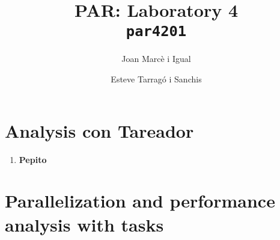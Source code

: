 \documentclass[a4paper]{article}
\title{PAR: Laboratory 4 \\
		\texttt{\large par4201}}
\author{Joan Marcè i Igual \and Esteve Tarragó i Sanchis}
\newenvironment{questionenum}
{%
\newcommand{\question}[1]{
\begin{enumerate}
	\item\bfseries ##1
\end{enumerate}
}}{%
}
\begin{document}
\maketitle
\tableofcontents

\section{Analysis con Tareador}
\begin{questionenum}
	\question{Pepito}
\end{questionenum}

\section{Parallelization and performance analysis with tasks}
\end{document}
